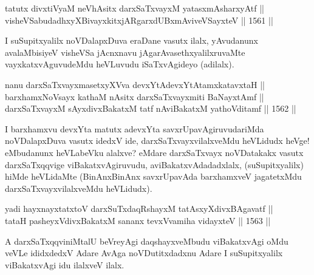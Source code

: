 \begin{shl}
\footnotemark[1]tatutx divxtiVyaM neVhAsitx darxSaTxvayxM yatasxmAsharxyAtf || \\
visheVSabudadhxyXBivayxkitxjARgarxdUBxmAviveVSayxteV \hfill || 1561 ||
\end{shl}

\begin{artha}
I suSupitxyalilx noVDalapxDuva eraDane vasutx ilalx, yAvudanunx avalaMbisiyeV visheVSa jAcnxnavu jAgarAvasethxyalilxruvaMte vayxkatxvAguvudeMdu heVLuvudu iSaTxvAgideyo (adilalx).
\end{artha}


\begin{shl}
nanu darxSaTxvayxmasetxyXVva devxYtAdevxYtAtamxkatavxtaH || \\
barxhamxNoV\s sayx kathaM nAsitx darxSaTxvayxmiti BaNayxtAmf || \\
\footnotemark[2]darxSaTxvayxM sAyxdivxBakatxM tatf nAviBakatxM yathoVditamf \hfill || 1562 ||  
\end{shl}

\begin{artha}
I barxhamxvu devxYta matutx adevxYta savxrUpavAgiruvudariMda noVDalapxDuva vasutx idedxV ide, darxSaTxvayxvilalxveMdu heVLidudx heVge! eMbudanunx heVLabeVku alalxve? eMdare darxSaTxvayx noVDatakakx vasutx darxSaTxqqvige viBakatxvAgiruvudu, aviBakatxvAdadadxlalx, (suSupitxyalilx) hiMde heVLidaMte (BinAnxBinAnx savxrUpavAda barxhamxveV jagatetxMdu darxSaTxvayxvilalxveMdu heVLidudx).
\end{artha}

\begin{shl}
yadi hayxnayxtatxtoV darxSuTxdaqRshayxM tatAsxyXdivxBAgavatf ||\\
tataH pasheyxVdivxBakatxM sananx tevxVvamiha vidayxteV \hfill || 1563 ||  
\end{shl}

\begin{artha}
A darxSaTxqqviniMtalU beVreyAgi daqshayxveMbudu viBakatxvAgi oMdu veVLe ididxdedxV Adare AvAga noVDutitxdadxnu Adare I suSupitxyalilx viBakatxvAgi idu ilalxveV ilalx.
\end{artha}

